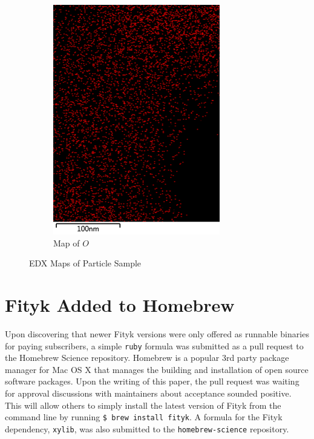 \documentclass[12pt,a4paper]{article}
\begin{document}
\begin{figure}[htbp]
\begin{subfigure}[b]{0.35\textwidth}
    \includegraphics[width=\textwidth]{Data/O Map.png}
    \caption{Map of $O$}
    \label{fig:o_map}
  \end{subfigure}
  \caption{EDX Maps of Particle Sample}\label{fig:map_grid}
\end{figure}



\section{Fityk Added to Homebrew} %
\label{sec:fityk_homebrew}

Upon discovering that newer Fityk versions were only offered as runnable binaries for paying subscribers, a simple \texttt{ruby} formula was submitted as a pull request to the Homebrew Science repository\cite{hbs}.  Homebrew\cite{home} is a popular 3rd party package manager for Mac OS X that manages the building and installation of open source software packages.  Upon the writing of this paper, the pull request was waiting for approval discussions with maintainers about acceptance sounded positive\cite{fpr}.  This will allow others to simply install the latest version of Fityk from the command line by running \texttt{\$ brew install fityk}.  A formula for the Fityk dependency, \texttt{xylib}, was also submitted to the \texttt{homebrew-science} repository\cite{xpr}.
\end{document}
